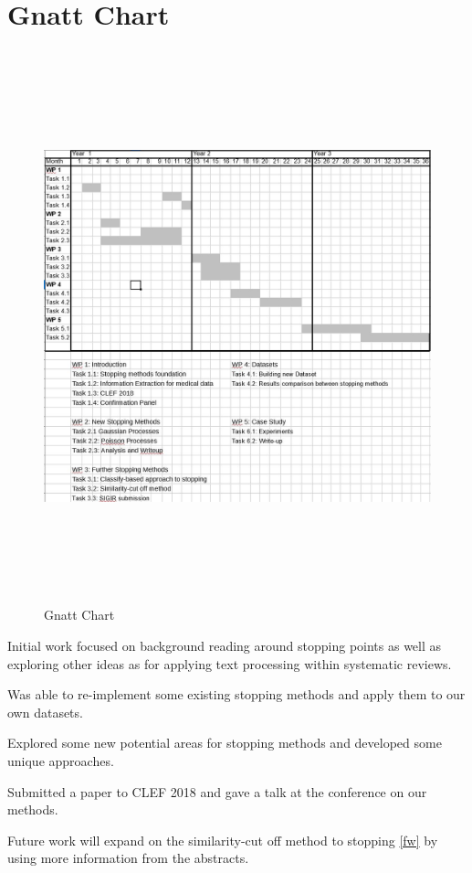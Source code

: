 \section{Gnatt Chart} \label{gnatt}


\begin{figure}[H]
\center
\includegraphics[height=16cm]{figures/gnatt_chart2.jpg}
\caption{Gnatt Chart}
\end{figure}

Initial work focused on background reading around stopping points as well as exploring other ideas as for applying text processing within systematic reviews.

Was able to re-implement some existing stopping methods and apply them to our own datasets.

Explored some new potential areas for stopping methods and developed some unique approaches.

Submitted a paper to CLEF 2018 and gave a talk at the conference on our methods.

Future work will expand on the similarity-cut off method to stopping \ref{fw} by using more information from the abstracts.


